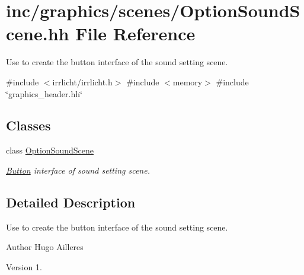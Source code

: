 \hypertarget{OptionSoundScene_8hh}{}\section{inc/graphics/scenes/\+Option\+Sound\+Scene.hh File Reference}
\label{OptionSoundScene_8hh}


Use to create the button interface of the sound setting scene.  


{\ttfamily \#include $<$irrlicht/irrlicht.\+h$>$}\newline
{\ttfamily \#include $<$memory$>$}\newline
{\ttfamily \#include \char`\"{}graphics\+\_\+header.\+hh\char`\"{}}\newline
\subsection*{Classes}
\begin{DoxyCompactItemize}
\item 
class \hyperlink{classOptionSoundScene}{Option\+Sound\+Scene}
\begin{DoxyCompactList}\small\item\em \hyperlink{classButton}{Button} interface of sound setting scene. \end{DoxyCompactList}\end{DoxyCompactItemize}


\subsection{Detailed Description}
Use to create the button interface of the sound setting scene. 

\begin{DoxyAuthor}{Author}
Hugo Ailleres 
\end{DoxyAuthor}
\begin{DoxyVersion}{Version}
1. 
\end{DoxyVersion}
